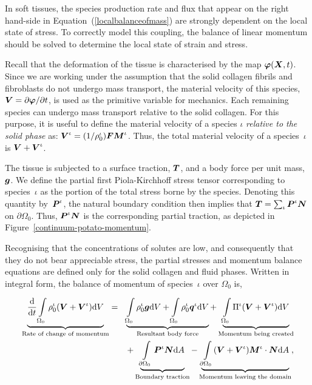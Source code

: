 In soft tissues, the species production rate and flux that appear on
the right hand-side in Equation~(\ref{localbalanceofmass}) are
strongly dependent on the local state of stress. To correctly model
this coupling, the balance of linear momentum should be solved to
determine the local state of strain and stress.

Recall that the deformation of the tissue is characterised by the map
$\mbox{\boldmath$\varphi$}(\mbox{\boldmath$ X$},t)$. Since we are working under the assumption that the
solid collagen fibrils and fibroblasts do not undergo mass transport,
the material velocity of this species, $\mbox{\boldmath$ V$} = \partial \mbox{\boldmath$\varphi$} /
\partial t$, is used as the primitive variable for mechanics. Each
remaining species can undergo mass transport relative to the solid
collagen. For this purpose, it is useful to define the material
velocity of a species $\iota$ \emph{relative to the solid phase} as:
$\mbox{\boldmath$ V$}^\iota = (1/\rho_0^\iota)\mbox{\boldmath$ F$}\mbox{\boldmath$ M$}^\iota$. Thus, the total material
velocity of a species~$\iota$ is $\mbox{\boldmath$ V$}+\mbox{\boldmath$ V$}^\iota$.

The tissue is subjected to a surface traction, $\mbox{\boldmath$ T$}$, and a body force
per unit mass,~$\mbox{\boldmath$ g$}$. We define the partial first Piola-Kirchhoff
stress tensor corresponding to species~$\iota$ as the portion of the
total stress borne by the species. Denoting this quantity
by~$\mbox{\boldmath$ P$}^\iota$, the natural boundary condition then implies that $\mbox{\boldmath$ T$}
= \sum_{\iota}\mbox{\boldmath$ P$}^\iota\mbox{\boldmath$ N$}$ on $\partial\Omega_0$. Thus,
$\mbox{\boldmath$ P$}^\iota\mbox{\boldmath$ N$}$ is the corresponding partial traction, as depicted in
Figure~\ref{continuum-potato-momentum}.

Recognising that the concentrations of solutes are low, and
consequently that they do not bear appreciable stress, the partial
stresses and momentum balance equations are defined only for the solid
collagen and fluid phases. Written in integral form, the balance of
momentum of species~$\iota$ over $\Omega_0$ is,

\begin{eqnarray}
\underbrace{\frac{\mathrm{d}}{\mathrm{d}t} \int\limits_{\Omega_0}
  \rho_0^\iota(\mbox{\boldmath$ V$}+\mbox{\boldmath$ V$}^\iota) \mathrm{d}V}_{\text{Rate of change of
    momentum}} &=& \underbrace{\int\limits_{\Omega_0} \rho^\iota_0\mbox{\boldmath$ g$}
  \mathrm{d}V + \int\limits_{\Omega_0} \rho^\iota_0\mbox{\boldmath$ q$}^\iota
  \mathrm{d}V}_{\text{Resultant body force}} +
\underbrace{\int\limits_{\Omega_0} \Pi^\iota(\mbox{\boldmath$ V$}+\mbox{\boldmath$ V$}^\iota)
  \mathrm{d}V}_{\text{Momentum being created}} \nonumber\\ & &+
\underbrace{\int\limits_{\partial \Omega_0}\mbox{\boldmath$ P$}^\iota\mbox{\boldmath$ N$}
  \mathrm{d}A}_{\text{Boundary traction}} -
\underbrace{\int\limits_{\partial
    \Omega_0}(\mbox{\boldmath$ V$}+\mbox{\boldmath$ V$}^\iota)\mbox{\boldmath$ M$}^\iota\cdot\mbox{\boldmath$ N$}
  \mathrm{d}A}_{\text{Momentum leaving the domain}},
\label{globalbalanceofmomentum}
\end{eqnarray}

